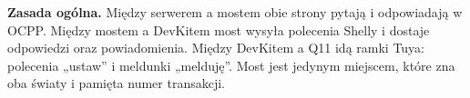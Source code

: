 \documentclass[11pt,a4paper]{article}
\begin{document}
\textbf{Zasada ogólna.} Między serwerem a mostem obie strony pytają i odpowiadają w OCPP. Między mostem a DevKitem most wysyła polecenia Shelly i dostaje odpowiedzi oraz powiadomienia. Między DevKitem a Q11 idą ramki Tuya: polecenia „ustaw” i meldunki „melduję”. Most jest jedynym miejscem, które zna oba światy i pamięta numer transakcji.
\end{document}
